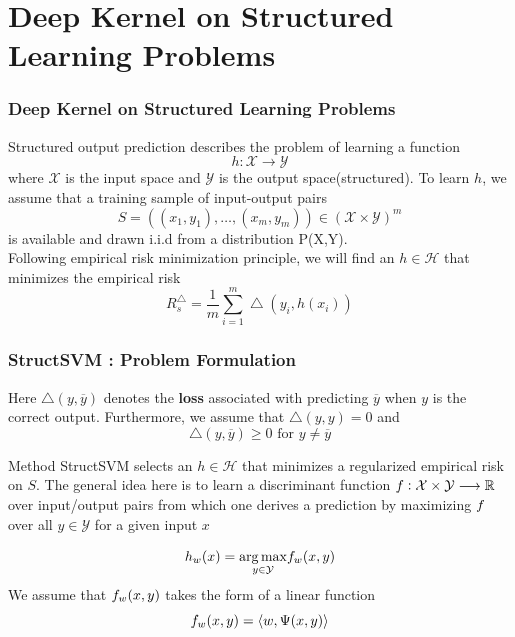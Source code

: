 \documentclass{beamer}
\begin{document}
\section{Deep Kernel on Structured Learning Problems}
\begin{frame}
\frametitle{Deep Kernel on Structured Learning Problems}
Structured output prediction describes the problem of learning a function
\[ h: \mathcal{X} \longrightarrow \mathcal{Y} \]
where $\mathcal{X}$ is the input space and $\mathcal{Y}$ is the output space(structured). To learn $h$, we assume that a training sample of input-output pairs
\[ S = ((x_1, y_1), \ldots, (x_m, y_m)) \in (\mathcal{X} \times \mathcal{Y})^m \]
is available and drawn i.i.d from a distribution P(X,Y).\\
Following empirical risk minimization principle, we will find an $h \in \mathcal{H}$ that minimizes the empirical risk
\[ R_s^{\bigtriangleup} = \frac{1}{m} \sum_{i=1}^m \bigtriangleup(y_i, h(x_i)) \]
\end{frame}


\begin{frame}
\frametitle{StructSVM : Problem Formulation}
Here $\bigtriangleup(y, \overline{y})$ denotes the \textbf{loss} associated with predicting $\overline{y}$ when $y$ is the correct output. Furthermore, we assume that $\bigtriangleup(y,y) = 0 $ and 
\[ \bigtriangleup(y, \overline{y}) \geq 0 \textrm{ for } y \neq \overline{y} \]
\begin{block}{Method}
StructSVM selects an $h \in \mathcal{H}$ that minimizes a regularized empirical risk\\
on $S$. The general idea here is to learn a discriminant function $\mathnormal{f} : \mathcal{X} \times \mathcal{Y} \longrightarrow \mathbb{R}$ over input/output pairs from which one derives a prediction by maximizing $\mathnormal{f}$ over all $y \in \mathcal{Y}$ for a given input $x$
\end{block}
\[ h_w(x) =  \underset{y \in \mathcal{Y}}{\arg\max} \mathnormal{f}_w(x,y) \]
We assume that $\mathnormal{f}_w(x,y)$ takes the form of a linear function
\[ \mathnormal{f}_w(x,y) = \langle w , \Psi(x,y) \rangle \]
\end{frame}
\end{document}
